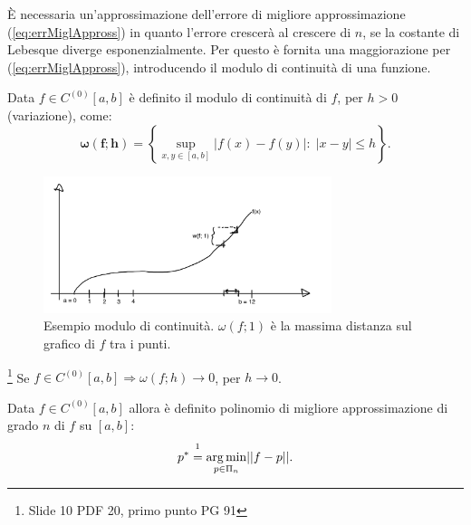 È necessaria un'approssimazione dell'errore di migliore approssimazione (\ref{eq:errMiglAppross}) in quanto l'errore crescerà al crescere di $n$, se la costante di Lebesque diverge esponenzialmente. Per questo è fornita una maggiorazione per (\ref{eq:errMiglAppross}), introducendo il modulo di continuità di una funzione.

\begin{definition}
    Data $f\in C^{(0)}[a,b]$ è definito il modulo di continuità di $f$, per $h>0$ (variazione), come:
    \begin{equation}\label{eq:modCont}
        \boldsymbol{\omega(f;h)}=\left\{\underset{x,y\in [a,b]}{\sup}|f(x)-f(y)|:\; |x-y|\leq h\right\}.
    \end{equation}
\end{definition}

\begin{figure}
    \centering
    \includegraphics[width=0.75\textwidth]{immagini/modContEs.png}
    \caption{Esempio modulo di continuità. $\omega (f;1)$ è la massima distanza sul grafico di $f$ tra i punti.}\label{fig:modContEs}
\end{figure}

\begin{theorem}\label{th:modContInf}\footnote{Slide 10 PDF 20, primo punto PG 91}
    Se $f\in C^{(0)}[a,b]\Rightarrow\omega (f;h)\rightarrow 0$, per $h\rightarrow 0$.
\end{theorem}

\begin{definition}
    Data $f\in C^{(0)}[a,b]$ allora è definito polinomio di migliore approssimazione di grado $n$ di $f$ su $[a,b]$:
    \begin{equation}
        p^* \overset{\footnotemark}{=} \underset{p\in\Pi_n}{\arg\min}||f-p||.
    \end{equation}
\end{definition}


